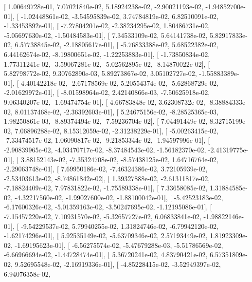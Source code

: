 \documentclass{article}
\begin{document}
       [  1.00649728e-01,   7.07021840e-02,   5.18924238e-02,
         -2.90021193e-02,  -1.94852700e-01],
       [ -1.02448861e-02,  -3.54595839e-02,   3.74784819e-02,
          6.82510091e-02,  -1.33453892e-01],
       [ -7.27804201e-02,  -2.38234295e-02,   1.80486731e-02,
         -5.05697630e-02,  -1.50484583e-01],
       [  7.34533109e-02,   5.64141738e-02,   5.82917833e-02,
          6.57738845e-02,  -2.18805617e-01],
       [ -5.76833388e-02,   5.68522382e-02,   6.44162674e-02,
         -8.19800651e-02,  -1.22253883e-01],
       [ -1.73850834e-02,   1.77311241e-02,  -3.59067281e-02,
         -5.02562895e-02,  -8.14870022e-02],
       [  5.82798772e-02,   9.30762890e-03,   5.89273867e-02,
          3.05102727e-02,  -1.55883389e-01],
       [  4.40142218e-02,  -2.67178569e-02,   5.20554374e-02,
         -5.62868729e-02,  -2.01629972e-01],
       [ -8.01598964e-02,   2.42140866e-03,  -7.50625918e-02,
          9.06340207e-02,  -1.69474754e-01],
       [  4.66783848e-02,   3.62308732e-02,  -8.38884333e-02,
          8.01137468e-02,  -2.36392603e-01],
       [  5.24675156e-02,  -8.28525365e-03,   1.98250861e-03,
         -8.89374494e-02,  -7.59236704e-02],
       [  7.04491449e-02,   8.32715199e-02,   7.06896288e-02,
          8.15312059e-02,  -2.31238229e-01],
       [ -5.00263415e-02,  -7.33474517e-02,   1.06090817e-02,
         -9.21853344e-02,  -1.94597996e-01],
       [ -2.90839965e-02,  -4.03470717e-02,  -8.37484543e-02,
         -1.56182370e-02,  -2.41319775e-01],
       [  3.88152143e-02,  -7.35324708e-02,  -8.57438125e-02,
          1.64716764e-02,  -2.29063748e-01],
       [  7.69950186e-02,  -7.46324386e-02,   3.72105939e-02,
         -2.53403613e-02,  -8.74861842e-02],
       [  1.39327888e-02,  -2.61311817e-02,  -7.18824409e-02,
          7.97831822e-02,  -1.75589338e-01],
       [  7.33658085e-02,   1.31884585e-02,  -4.32217560e-02,
         -1.99027600e-02,  -1.88100042e-01],
       [ -5.42523183e-02,  -6.17600326e-02,  -5.01359163e-02,
         -3.50247695e-02,  -1.12195086e-01],
       [ -7.15457220e-02,   7.10931570e-02,  -5.32657727e-02,
          6.06833841e-02,  -1.98822146e-01],
       [ -9.54229537e-02,   5.79940255e-02,   1.31824746e-02,
         -6.79942120e-02,  -1.62174296e-01],
       [  5.92535149e-02,  -5.63709346e-02,   2.57193449e-02,
          1.81923309e-02,  -1.69195623e-01],
       [ -6.56275574e-02,  -5.47679288e-03,  -5.51786569e-02,
         -6.66966694e-02,  -1.44728474e-01],
       [  5.36720241e-02,   4.83790421e-02,   6.57351809e-02,
          9.52695548e-02,  -2.16919336e-01],
       [ -4.85228415e-02,  -3.52949397e-02,   6.94076358e-02,
\end{document}
